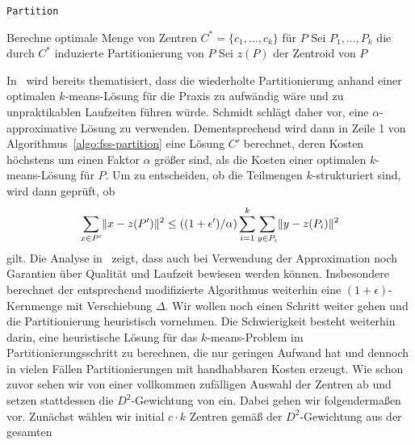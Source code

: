 \begin{algorithm}
\caption{\texttt{Partition}~\cite{FeldmanSS13,Schmidt14}}
\label{algo:fss-partition}
	\DontPrintSemicolon
	
	\BlankLine
	
	Berechne optimale Menge von Zentren $C^* = \{c_1, \dots, c_k\}$ für $P$\;
	Sei $P_1, \dots, P_k$ die durch $C^*$ induzierte Partitionierung von $P$\;
	Sei $z(P)$ der Zentroid von $P$\;
\end{algorithm}
In~\cite{Schmidt14} wird bereits thematisiert, dass die wiederholte Partitionierung anhand einer optimalen $k$-means-Lösung
für die Praxis zu aufwändig wäre und zu unpraktikablen Laufzeiten führen würde. Schmidt schlägt daher vor, eine
$\alpha$-approximative Lösung zu verwenden. Dementsprechend wird dann in Zeile 1 von Algorithmus~\ref{algo:fss-partition}
eine Lösung $C'$ berechnet, deren Kosten höchstens um einen Faktor $\alpha$ größer sind, als die Kosten einer optimalen
$k$-means-Lösung für $P$. Um zu entscheiden, ob die Teilmengen $k$-strukturiert sind, wird dann geprüft, ob
\[ \sum_{x \in P'} \lVert {x} - {z(P')} \rVert^2 \leq ((1+\epsilon')/\alpha) \sum_{i=1}^{k} \sum_{y \in P_i} \lVert {y} - {z(P_i)} \rVert^2 \]
gilt. Die Analyse in~\cite{Schmidt14} zeigt, dass auch bei Verwendung der Approximation noch Garantien über Qualität und
Laufzeit bewiesen werden können. Insbesondere berechnet der entsprechend modifizierte Algorithmus weiterhin eine
$(1+\epsilon)$-Kernmenge mit Verschiebung $\Delta$.
\absatz
Wir wollen noch einen Schritt weiter gehen und die Partitionierung heuristisch vornehmen. Die Schwierigkeit besteht weiterhin
darin, eine heuristische Lösung für das $k$-means-Problem im Partitionierungsschritt zu berechnen, die nur geringen Aufwand
hat und dennoch in vielen Fällen Partitionierungen mit handhabbaren Kosten erzeugt. Wie schon zuvor sehen wir von einer
vollkommen zufälligen Auswahl der Zentren ab und setzen stattdessen die $D^2$-Gewichtung von \kmpp{} ein. Dabei gehen
wir folgendermaßen vor. Zunächst wählen wir initial $c \cdot k$ Zentren gemäß der $D^2$-Gewichtung aus der gesamten
